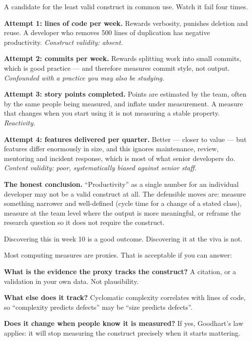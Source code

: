 \begin{worked}
A candidate for the least valid construct in common use. Watch it fail four
times.

\medskip
\textbf{Attempt 1: lines of code per week.} Rewards verbosity, punishes
deletion and reuse. A developer who removes 500 lines of duplication has
negative productivity. \emph{Construct validity: absent.}

\medskip
\textbf{Attempt 2: commits per week.} Rewards splitting work into small
commits, which is good practice --- and therefore measures commit style, not
output. \emph{Confounded with a practice you may also be studying.}

\medskip
\textbf{Attempt 3: story points completed.} Points are estimated by the team,
often by the same people being measured, and inflate under measurement. A
measure that changes when you start using it is not measuring a stable
property. \emph{Reactivity.}

\medskip
\textbf{Attempt 4: features delivered per quarter.} Better --- closer to value
--- but features differ enormously in size, and this ignores maintenance,
review, mentoring and incident response, which is most of what senior
developers do. \emph{Content validity: poor, systematically biased against
senior staff.}

\medskip
\textbf{The honest conclusion.} ``Productivity'' as a single number for an
individual developer may not be a valid construct at all. The defensible moves
are: measure something narrower and well-defined (cycle time for a change of a
stated class), measure at the team level where the output is more meaningful,
or reframe the research question so it does not require the construct.

\medskip
Discovering this in week 10 is a good outcome. Discovering it at the viva is
not.
\end{worked}

\begin{pitfall}
Most computing measures are proxies. That is acceptable if you can answer:

\begin{tightnum}
  \item \textbf{What is the evidence the proxy tracks the construct?} A
    citation, or a validation in your own data. Not plausibility.
  \item \textbf{What else does it track?} Cyclomatic complexity correlates with
    lines of code, so ``complexity predicts defects'' may be ``size predicts
    defects''.
  \item \textbf{Does it change when people know it is measured?} If yes,
    Goodhart's law applies: it will stop measuring the construct precisely when
    it starts mattering.
\end{tightnum}
\end{pitfall}

